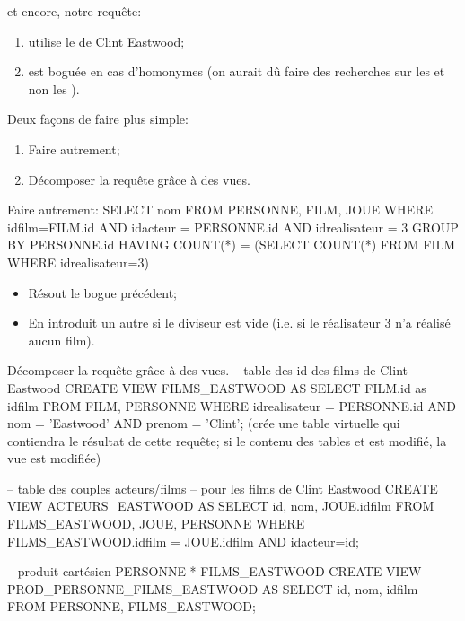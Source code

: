 et encore, notre requête:
\begin{enumerate}
\item utilise le \ttid{} de Clint Eastwood;
\item est boguée en cas d'homonymes (on aurait dû faire des recherches
  sur les \ttid{} et non les \ttnom{}).
\end{enumerate}

Deux façons de faire plus simple:
\begin{enumerate}
\item Faire autrement;
\item Décomposer la requête grâce à des vues.
\end{enumerate}

Faire autrement:
SELECT nom FROM PERSONNE, FILM, JOUE
WHERE idfilm=FILM.id 
      AND 
      idacteur = PERSONNE.id
      AND 
      idrealisateur = 3
GROUP BY PERSONNE.id
HAVING COUNT(*) =
  (SELECT COUNT(*) FROM FILM WHERE idrealisateur=3)
\begin{itemize}
\item Résout le bogue précédent;
\item En introduit un autre si le diviseur est vide (i.e. si le
  réalisateur $3$ n'a réalisé aucun film).
\end{itemize}

Décomposer la requête grâce à des vues.
-- table des id des films de Clint Eastwood
CREATE VIEW FILMS\_EASTWOOD AS
SELECT FILM.id as idfilm
FROM FILM, PERSONNE
WHERE idrealisateur = PERSONNE.id
      AND 
      nom = 'Eastwood' 
      AND 
      prenom = 'Clint';
(crée une table virtuelle qui contiendra le résultat de cette requête;
si le contenu des tables \FILM{} et \PERSONNE{} est modifié, la vue
est modifiée)

-- table des couples acteurs/films
-- pour les films de Clint Eastwood 
CREATE VIEW ACTEURS\_EASTWOOD AS
SELECT id, nom, JOUE.idfilm
FROM FILMS\_EASTWOOD, JOUE, PERSONNE
WHERE FILMS\_EASTWOOD.idfilm = JOUE.idfilm
      AND 
      idacteur=id;

-- produit cartésien PERSONNE * FILMS\_EASTWOOD
CREATE VIEW PROD\_PERSONNE\_FILMS\_EASTWOOD AS
SELECT id, nom, idfilm
FROM PERSONNE, FILMS\_EASTWOOD;

